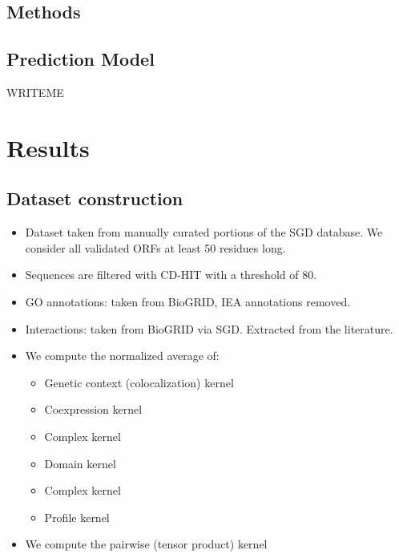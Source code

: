 \documentclass{bioinfo}
\begin{document}
\begin{methods}

\section{Methods}

\subsection{Prediction Model}

WRITEME

\end{methods}



\section{Results}

\subsection{Dataset construction}

\begin{itemize}

    \item Dataset taken from manually curated portions of the SGD database. We
    consider all validated ORFs at least 50 residues long.

    \item Sequences are filtered with CD-HIT with a threshold of 80.

    \item GO annotations: taken from BioGRID, IEA annotations removed.

    \item Interactions: taken from BioGRID via SGD. Extracted from the
    literature.

    \item We compute the normalized average of:

    \begin{itemize}

        \item Genetic context (colocalization) kernel

        \item Coexpression kernel

        \item Complex kernel

        \item Domain kernel

        \item Complex kernel

        \item Profile kernel

    \end{itemize}

    \item We compute the pairwise (tensor product) kernel

\end{itemize}
\end{document}
